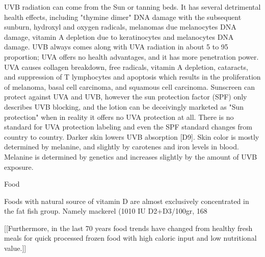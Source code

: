 UVB radiation can come from the Sun or tanning beds. It has several detrimental health effects, including "thymine dimer" DNA damage with the subsequent sunburn, hydroxyl and oxygen radicals, melanomas due melanocytes DNA damage, vitamin A depletion due to keratinocytes and melanocytes DNA damage. UVB always comes along with UVA radiation in about 5 to 95 proportion; UVA offers no health advantages, and it has more penetration power. UVA causes collagen breakdown, free radicals, vitamin A depletion, cataracts, and suppression of T lymphocytes and apoptosis which results in the proliferation of melanoma, basal cell carcinoma, and squamous cell carcinoma.  Sunscreen can protect against UVA and UVB, however the sun protection factor (SPF) only describes UVB blocking, and the lotion can be deceivingly marketed as "Sun protection" when in reality it offers no UVA protection at all. There is no standard for UVA protection labeling and even the SPF standard changes from country to country. Darker skin lowers UVB absorption [D9]. Skin color is mostly determined by melanine, and slightly by carotenes and iron levels in blood. Melanine is determined by genetics and increases slightly by the amount of UVB exposure. 

 

Food 

 

Foods with natural source of vitamin D are almost exclusively concentrated in the fat fish group. Namely mackerel (1010 IU D2+D3/100gr, 168%

 

[[Furthermore, in the last 70 years food trends have changed from healthy fresh meals for quick processed frozen food with high caloric input and low nutritional value.]] 

